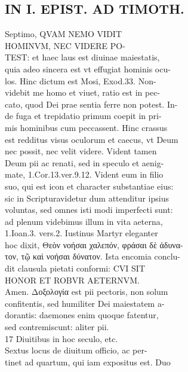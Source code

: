\documentclass{article}
\begin{document}
\begin{pages}
\section*{IN I. EPIST. AD TIMOTH. \\
                }
Septimo, QVAM NEMO VIDIT \\
                HOMINVM, NEC VIDERE PO- \\
                TEST: et haec laus est diuinae maiestatis, \\
                quia adeo sincera est vt effugiat hominis ocu- \\
                los. Hinc dictum est Mosi, Exod.33. Non- \\
                videbit me homo et viuet, ratio est in pec- \\
                cato, quod Dei prae sentia ferre non potest. In- \\
                de fuga et trepidatio primum coepit in pri- \\
                mis hominibus cum peccassent. Hinc crassus \\
                est redditus visus oculorum et caecus, vt Deum \\
                nec possit, nec velit videre. Vident tamen \\
                Deum pii ac renati, sed in speculo et aenig- \\
                mate, 1.Cor.13.ver.9.12. Vident eum in filio \\
                suo, qui est icon et character substantiae eius: \\
                sic in Scripturavidetur dum attenditur ipsius \\
                voluntas, sed omnes isti modi imperfecti sunt: \\
                ad plenum videbimus illum in vita aeterna, \\
                1.Ioan.3. vers.2. Iustinus Martyr eleganter \\
                hoc dixit, Θεὸν νοήσαι χαλεπόν, φράσαι δὲ ἀδυνα- \\
                τον, τῷ καὶ νοήσαι δύνατον. Ista encomia conclu- \\
                dit clausula pietati conformi: CVI SIT \\
                HONOR ET ROBVR AETERNVM. \\
                Amen. Δοξολογία est pii pectoris, non solum \\
                confitentis, sed humiliter Dei maiestatem a- \\
                dorantis: daemones enim quoque fatentur, \\
                sed contremiscunt: aliter pii. \\
                17 Diuitibus in hoc seculo, etc. \\
                Sextus locus de diuitum officio, ac per- \\
                tinet ad quartum, qui iam expositus est. Duo \\
                

\end{pages}
\end{document}
